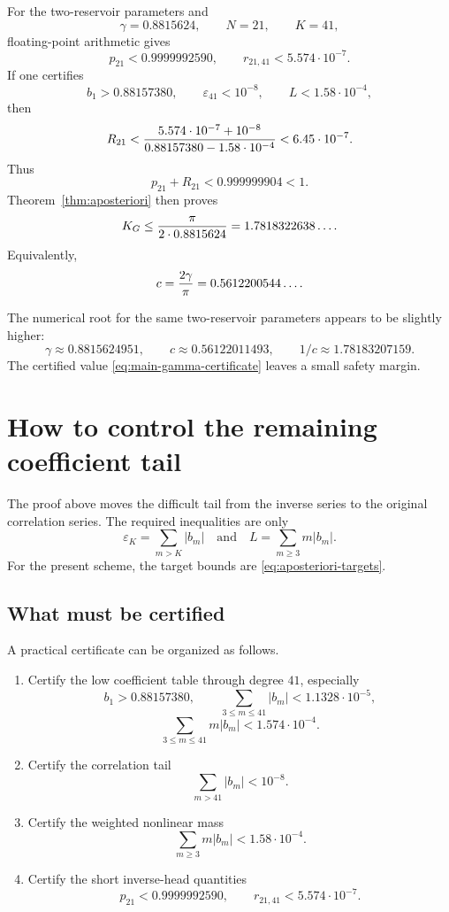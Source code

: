 \documentclass[11pt]{article}
\newcommand{\1}{\mathbf{1}}
\newcommand{\eps}{\varepsilon}
\newcommand{\abs}[1]{\left\lvert #1\right\rvert}
\begin{document}
For the two-reservoir parameters and
\[
        \gamma=0.8815624,
        \qquad N=21,
        \qquad K=41,
\]
floating-point arithmetic gives
\begin{equation}\label{eq:p21-r21-values}
        p_{21}<0.9999992590,
        \qquad
        r_{21,41}<5.574\cdot10^{-7}.
\end{equation}
If one certifies
\begin{equation}\label{eq:aposteriori-targets}
        b_1>0.88157380,
        \qquad
        \eps_{41}<10^{-8},
        \qquad
        L<1.58\cdot10^{-4},
\end{equation}
then
\[
        R_{21}< {5.574\cdot10^{-7}+10^{-8}\over 0.88157380-1.58\cdot10^{-4}}
        <6.45\cdot10^{-7}.
\]
Thus
\[
        p_{21}+R_{21}<0.999999904<1.
\]
Theorem~\ref{thm:aposteriori} then proves
\begin{equation}\label{eq:main-gamma-certificate}
        K_G\le {\pi\over 2\cdot0.8815624}
        =1.7818322638\ldots.
\end{equation}
Equivalently,
\[
        c={2\gamma\over\pi}=0.5612200544\ldots.
\]

The numerical root for the same two-reservoir parameters appears to be slightly higher:
\[
        \gamma\approx0.8815624951,
        \qquad
        c\approx0.56122011493,
        \qquad
        1/c\approx1.78183207159.
\]
The certified value \eqref{eq:main-gamma-certificate} leaves a small safety margin.

\section{How to control the remaining coefficient tail}

The proof above moves the difficult tail from the inverse series to the original correlation series.  The required inequalities are only
\[
        \eps_K=\sum_{m>K}\abs{b_m}\quad\text{and}\quad
        L=\sum_{m\ge3}m\abs{b_m}.
\]
For the present scheme, the target bounds are \eqref{eq:aposteriori-targets}.

\subsection{What must be certified}

A practical certificate can be organized as follows.

\begin{enumerate}[label=\textbf{C\arabic*.}, leftmargin=0.8in]
\item Certify the low coefficient table through degree \(41\), especially
\[
        b_1>0.88157380,
        \qquad
        \sum_{3\le m\le41}\abs{b_m}<1.1328\cdot10^{-5},
\]
\[
        \sum_{3\le m\le41}m\abs{b_m}<1.574\cdot10^{-4}.
\]
\item Certify the correlation tail
\[
        \sum_{m>41}\abs{b_m}<10^{-8}.
\]
\item Certify the weighted nonlinear mass
\[
        \sum_{m\ge3}m\abs{b_m}<1.58\cdot10^{-4}.
\]
\item Certify the short inverse-head quantities
\[
        p_{21}<0.9999992590,
        \qquad
        r_{21,41}<5.574\cdot10^{-7}.
\]
\end{enumerate}
\end{document}
